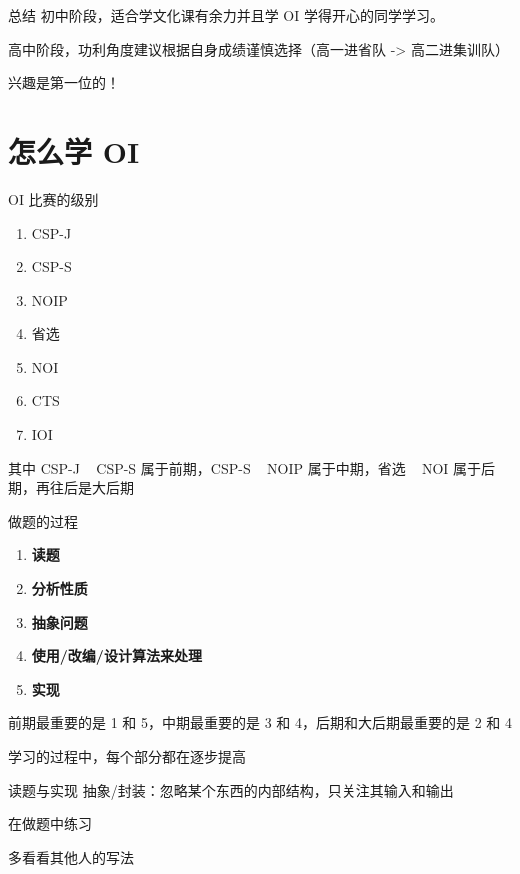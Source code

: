 \documentclass[11pt,aspectratio=169]{beamer}
\begin{document}
\begin{frame}{总结}
    初中阶段，适合学文化课有余力并且学 OI 学得开心的同学学习。

    高中阶段，功利角度建议根据自身成绩谨慎选择（高一进省队 -> 高二进集训队）

    兴趣是第一位的！
\end{frame}
\section{怎么学 OI}

\begin{frame}{OI 比赛的级别}
    \begin{enumerate}
        \item CSP-J
        \item CSP-S
        \item NOIP
        \item 省选
        \item NOI
        \item CTS
        \item IOI
    \end{enumerate}
    其中 CSP-J ~ CSP-S 属于前期，CSP-S ~ NOIP 属于中期，省选 ~ NOI 属于后期，再往后是大后期
\end{frame}

\begin{frame}{做题的过程}
\begin{enumerate}
    \item \textbf{读题}
    \item \textbf{分析性质}
    \item \textbf{抽象问题}
    \item \textbf{使用/改编/设计算法来处理}
    \item \textbf{实现}
\end{enumerate}

前期最重要的是 1 和 5，中期最重要的是 3 和 4，后期和大后期最重要的是 2 和 4

学习的过程中，每个部分都在逐步提高
\end{frame}

\begin{frame}{读题与实现}
    抽象/封装：忽略某个东西的内部结构，只关注其输入和输出

    在做题中练习

    多看看其他人的写法
\end{frame}
\end{document}
